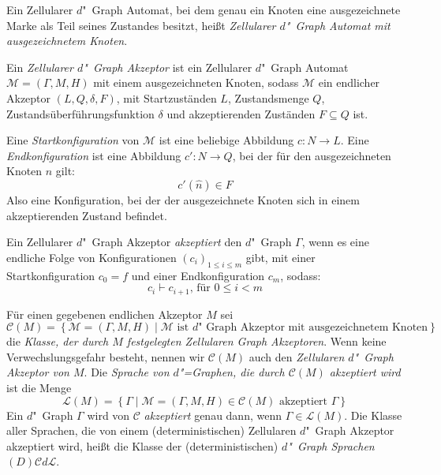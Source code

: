 \documentclass[11pt]{article}
\newcommand{\defWord}[1]{\emph{#1}}
\begin{document}
\begin{definition}[Akzeptanz]
	Ein Zellularer $d$"~Graph Automat, bei dem genau ein Knoten eine ausgezeichnete Marke als Teil seines Zustandes  besitzt, heißt \defWord{Zellularer $d$"~Graph Automat mit ausgezeichnetem Knoten}.
	
	Ein \defWord{Zellularer $d$"~Graph Akzeptor} ist ein Zellularer $d$"~Graph Automat $\mathcal{M} = \left(\Gamma, M, H \right)$ mit einem ausgezeichneten Knoten, sodass $\mathcal{M}$ ein endlicher Akzeptor $\left(L, Q, \delta, F\right)$, mit Startzuständen $L$, Zustandsmenge $Q$, Zustandsüberführungsfunktion $\delta$ und akzeptierenden Zuständen $F \subseteq Q$ ist.
	
	Eine \defWord{Startkonfiguration} von $\mathcal{M}$ ist eine beliebige Abbildung $c : N \rightarrow L$. 
	Eine \defWord{Endkonfiguration} ist eine Abbildung $c' : N \rightarrow Q$, bei der für den ausgezeichneten Knoten $\hat{n}$ gilt: 
	\begin{displaymath}
		c'(\hat{n}) \in F
	\end{displaymath} 
	Also eine Konfiguration, bei der der ausgezeichnete Knoten sich in einem akzeptierenden Zustand befindet.
	
	Ein Zellularer $d$"~Graph Akzeptor \defWord{akzeptiert} den $d$"~Graph $\Gamma$, wenn es eine endliche Folge von Konfigurationen $\left(c_i\right)_{1 \le i \le m}$ gibt, mit einer Startkonfiguration $c_0 = f$ und einer Endkonfiguration $c_m$, sodass:
	\begin{displaymath}
		c_{i} \vdash c_{i+1} \text{, für } 0 \le i < m
	\end{displaymath}
\end{definition}

\begin{definition}[Sprachen]
	Für einen gegebenen endlichen Akzeptor $M$ sei 
	\begin{displaymath}
		\mathcal{C}(M) = \left\{\mathcal{M} = \left(\Gamma, M, H\right) \mid \mathcal{M} \text{ ist $d$"~Graph Akzeptor mit ausgezeichnetem Knoten} \right\}
	\end{displaymath} 
	die \defWord{Klasse, der durch $M$ festgelegten Zellularen Graph Akzeptoren}. 
	Wenn keine Verwechslungsgefahr besteht, nennen wir $\mathcal{C}(M)$ auch den \defWord{Zellularen $d$"~Graph Akzeptor von $M$}.
	Die \defWord{Sprache von $d$"=Graphen, die durch $\mathcal{C}(M)$ akzeptiert wird} ist die Menge 
	\begin{displaymath}
		\mathcal{L}(M) = \left\{\Gamma \mid \mathcal{M} = \left(\Gamma, M, H\right) \in \mathcal{C}(M) \text{ akzeptiert } \Gamma \right\}
	\end{displaymath}
	Ein $d$"~Graph $\Gamma$ wird von $\mathcal{C}$ \defWord{akzeptiert} genau dann, wenn $\Gamma \in \mathcal{L}(M)$.
	Die Klasse aller Sprachen, die von einem (deterministischen) Zellularen $d$"~Graph Akzeptor akzeptiert wird, heißt die Klasse der (deterministischen) \defWord{$d$"~Graph Sprachen} $(D)\mathcal{C}d\mathcal{L}$. 
\end{definition}
\end{document}
